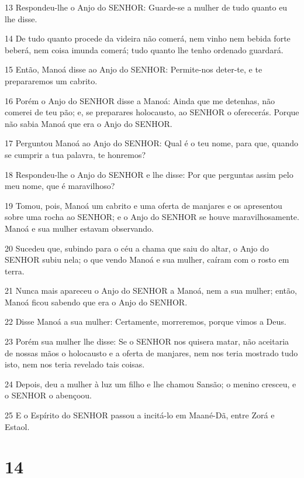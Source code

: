 \par 13 Respondeu-lhe o Anjo do SENHOR: Guarde-se a mulher de tudo quanto eu lhe disse.
\par 14 De tudo quanto procede da videira não comerá, nem vinho nem bebida forte beberá, nem coisa imunda comerá; tudo quanto lhe tenho ordenado guardará.
\par 15 Então, Manoá disse ao Anjo do SENHOR: Permite-nos deter-te, e te prepararemos um cabrito.
\par 16 Porém o Anjo do SENHOR disse a Manoá: Ainda que me detenhas, não comerei de teu pão; e, se preparares holocausto, ao SENHOR o oferecerás. Porque não sabia Manoá que era o Anjo do SENHOR.
\par 17 Perguntou Manoá ao Anjo do SENHOR: Qual é o teu nome, para que, quando se cumprir a tua palavra, te honremos?
\par 18 Respondeu-lhe o Anjo do SENHOR e lhe disse: Por que perguntas assim pelo meu nome, que é maravilhoso?
\par 19 Tomou, pois, Manoá um cabrito e uma oferta de manjares e os apresentou sobre uma rocha ao SENHOR; e o Anjo do SENHOR se houve maravilhosamente. Manoá e sua mulher estavam observando.
\par 20 Sucedeu que, subindo para o céu a chama que saiu do altar, o Anjo do SENHOR subiu nela; o que vendo Manoá e sua mulher, caíram com o rosto em terra.
\par 21 Nunca mais apareceu o Anjo do SENHOR a Manoá, nem a sua mulher; então, Manoá ficou sabendo que era o Anjo do SENHOR.
\par 22 Disse Manoá a sua mulher: Certamente, morreremos, porque vimos a Deus.
\par 23 Porém sua mulher lhe disse: Se o SENHOR nos quisera matar, não aceitaria de nossas mãos o holocausto e a oferta de manjares, nem nos teria mostrado tudo isto, nem nos teria revelado tais coisas.
\par 24 Depois, deu a mulher à luz um filho e lhe chamou Sansão; o menino cresceu, e o SENHOR o abençoou.
\par 25 E o Espírito do SENHOR passou a incitá-lo em Maané-Dã, entre Zorá e Estaol.

\chapter{14}

